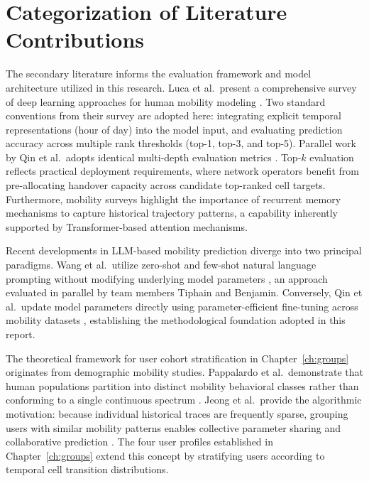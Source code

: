\section{Categorization of Literature Contributions}

The secondary literature informs the evaluation framework and model architecture utilized in this research. Luca et al.\ present a comprehensive survey of deep learning approaches for human mobility modeling \textbf{\cite{luca2021survey}}. Two standard conventions from their survey are adopted here: integrating explicit temporal representations (hour of day) into the model input, and evaluating prediction accuracy across multiple rank thresholds (top-1, top-3, and top-5). Parallel work by Qin et al.\ adopts identical multi-depth evaluation metrics \textbf{\cite{qin2025mobllm}}. Top-$k$ evaluation reflects practical deployment requirements, where network operators benefit from pre-allocating handover capacity across candidate top-ranked cell targets. Furthermore, mobility surveys highlight the importance of recurrent memory mechanisms to capture historical trajectory patterns, a capability inherently supported by Transformer-based attention mechanisms.

Recent developments in LLM-based mobility prediction diverge into two principal paradigms. Wang et al.\ utilize zero-shot and few-shot natural language prompting without modifying underlying model parameters \textbf{\cite{wang2023llmmob}}, an approach evaluated in parallel by team members Tiphain and Benjamin. Conversely, Qin et al.\ update model parameters directly using parameter-efficient fine-tuning across mobility datasets \textbf{\cite{qin2025mobllm}}, establishing the methodological foundation adopted in this report.

The theoretical framework for user cohort stratification in Chapter~\ref{ch:groups} originates from demographic mobility studies. Pappalardo et al.\ demonstrate that human populations partition into distinct mobility behavioral classes rather than conforming to a single continuous spectrum \textbf{\cite{pappalardo2015returners}}. Jeong et al.\ provide the algorithmic motivation: because individual historical traces are frequently sparse, grouping users with similar mobility patterns enables collective parameter sharing and collaborative prediction \textbf{\cite{jeong2016cluster}}. The four user profiles established in Chapter~\ref{ch:groups} extend this concept by stratifying users according to temporal cell transition distributions.

